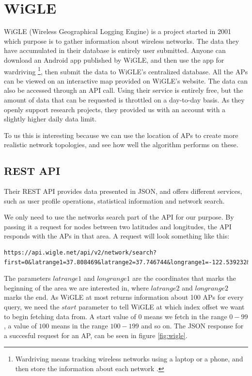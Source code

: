 \documentclass[a4paper,UKenglish]{report}
\begin{document}
\section{WiGLE}
WiGLE (Wireless Geographical Logging Engine) \cite{wigle} is a project started in 2001
which purpose is to gather information about wireless networks. The data they have
accumulated in their database is entirely user submitted. Anyone can download an 
Android app  published by WiGLE, and then use the app for wardriving
\footnote{Wardriving means tracking wireless networks using a laptop or a phone,
and then store the information about each network \cite{Wardriving}.},
then submit the data to WiGLE's centralized database. All the APs can be viewed on an interactive
map provided on WiGLE's website. The data can also be accessed through an API call.
Using their service is entirely free, but the amount of data
that can be requested is throttled on a day-to-day basis. As they openly support
research projects, they provided us with an account with a slightly higher daily data
limit.

To us this is interesting because we can use the location of APs to
create more realistic network topologies, and see how well the algorithm 
performs on these. 
 

\subsection{REST API}
Their REST API provides data presented in JSON, and offers different services,
such as user profile operations, statistical information and network search.

We only need to use the networks search part of the API for our purpose. 
By passing it a request for nodes between two latitudes
and longitudes, the API responds with the APs in that area.  
A request will look something like this: 
\begin{lstlisting}[breaklines]
https://api.wigle.net/api/v2/network/search?first=0&latrange1=37.808469&latrange2=37.746744&longrange1=-122.539232&longrange2=-122.381355
\end{lstlisting}
The parameters $latrange1$ and $longrange1$ are the coordinates that marks the beginning 
of the area we are interested in, where $latrange2$ and $longrange2$ marks the end. 
As WiGLE at most returns information about 100 APs for every query, we need the $start$
parameter to tell WiGLE at which index offset we want to begin fetching data from.
A start value of $0$ means we fetch in the range $0-99$, a value of $100$ means in the
range $100-199$ and so on. The JSON response for a succesful request for an AP,
can be seen in figure \ref{fig:wigle}.
\end{document}
